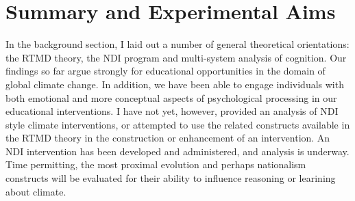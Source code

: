 \chapter{Summary and Experimental Aims}

In the background section, I laid out a number of general theoretical
orientations: the RTMD theory, the NDI program and multi-system analysis of
cognition. Our findings so far argue strongly for educational opportunities in
the domain of global climate change. In addition, we have been able to engage
individuals with both emotional and more conceptual aspects of psychological
processing in our educational interventions. I have not yet, however, provided
an analysis of NDI style climate interventions, or attempted to use the related
constructs available in the RTMD theory in the construction or enhancement of an
intervention. An NDI intervention has been developed and administered, and
analysis is underway.  Time permitting, the most proximal evolution and perhaps
nationalism constructs will be evaluated for their ability to influence
reasoning or learining about climate.

